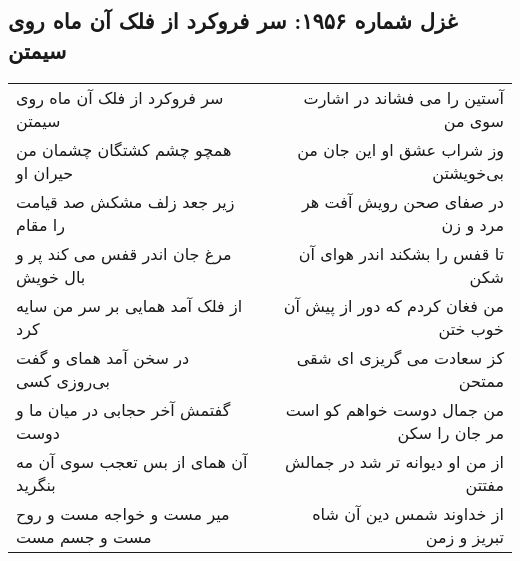 \begin{center}
\section*{غزل شماره ۱۹۵۶: سر فروکرد از فلک آن ماه روی سیمتن}
\label{sec:1956}
\begin{longtable}{l p{0.5cm} r}
سر فروکرد از فلک آن ماه روی سیمتن
&&
آستین را می فشاند در اشارت سوی من
\\
همچو چشم کشتگان چشمان من حیران او
&&
وز شراب عشق او این جان من بی‌خویشتن
\\
زیر جعد زلف مشکش صد قیامت را مقام
&&
در صفای صحن رویش آفت هر مرد و زن
\\
مرغ جان اندر قفس می کند پر و بال خویش
&&
تا قفس را بشکند اندر هوای آن شکن
\\
از فلک آمد همایی بر سر من سایه کرد
&&
من فغان کردم که دور از پیش آن خوب ختن
\\
در سخن آمد همای و گفت بی‌روزی کسی
&&
کز سعادت می گریزی ای شقی ممتحن
\\
گفتمش آخر حجابی در میان ما و دوست
&&
من جمال دوست خواهم کو است مر جان را سکن
\\
آن همای از بس تعجب سوی آن مه بنگرید
&&
از من او دیوانه تر شد در جمالش مفتتن
\\
میر مست و خواجه مست و روح مست و جسم مست
&&
از خداوند شمس دین آن شاه تبریز و زمن
\\
\end{longtable}
\end{center}
